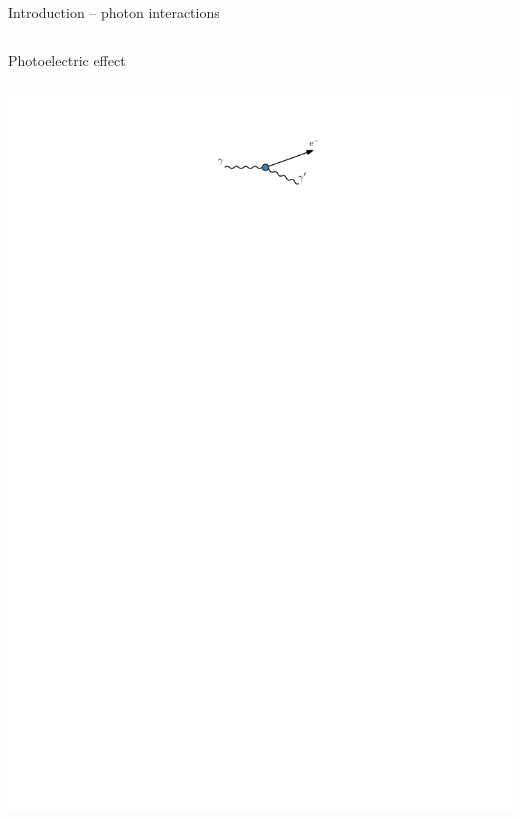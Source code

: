 \documentclass[11pt,xcolor=dvipsnames,professionalfonts,notes]{beamer}
\begin{document}
\begin{frame}{Introduction -- photon interactions}
\begin{columns}
			Photoelectric effect
	\end{columns}
	\vspace{-0.2cm}
	\begin{columns}
		\begin{center}
			\includegraphics{./figures/compton_intro.pdf}
		\end{center}
		

\end{columns}
\end{frame}
\end{document}
